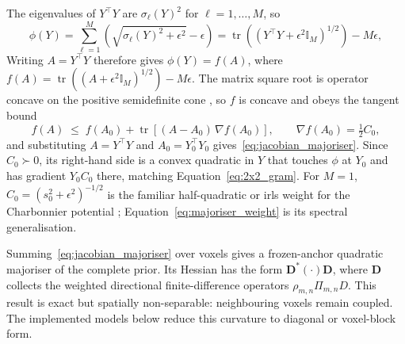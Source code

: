 The eigenvalues of $Y^\top Y$ are $\sigma_\ell(Y)^2$ for $\ell=1,\dots,M$, so
\begin{equation}
    \phi(Y)
    =\sum_{\ell=1}^{M}\left(\sqrt{\sigma_\ell(Y)^2+\epsilon^2}-\epsilon\right)
    =\operatorname{tr}\!\left(\left(Y^\top Y+\epsilon^2\mathbb{I}_M\right)^{1/2}\right)-M\epsilon ,
    \label{eq:phi_as_trace}
\end{equation}
Writing $A=Y^\top Y$ therefore gives $\phi(Y)=f(A)$, where $f(A)=\operatorname{tr}((A+\epsilon^2\mathbb{I}_M)^{1/2})-M\epsilon$. The matrix square root is operator concave on the positive semidefinite cone \cite{bhatiaMatrixAnalysis1997a}, so $f$ is concave and obeys the tangent bound
\begin{equation}
    f(A)\;\leq\;f(A_0)+\operatorname{tr}\!\left[(A-A_0)\,\nabla f(A_0)\right],
    \qquad
    \nabla f(A_0)=\tfrac12 C_0 ,
    \label{eq:concave_tangent}
\end{equation}
and substituting $A=Y^\top Y$ and $A_0=Y_0^\top Y_0$ gives~\eqref{eq:jacobian_majoriser}. Since $C_0\succ0$, its right-hand side is a convex quadratic in $Y$ that touches $\phi$ at $Y_0$ and has gradient $Y_0C_0$ there, matching Equation~\eqref{eq:2x2_gram}. For $M=1$, $C_0=(s_0^2+\epsilon^2)^{-1/2}$ is the familiar half-quadratic or \gls{irls} weight for the Charbonnier potential \cite{fessler_image_2017, charbonnier_deterministic_1997}; Equation~\eqref{eq:majoriser_weight} is its spectral generalisation.

Summing~\eqref{eq:jacobian_majoriser} over voxels gives a frozen-anchor quadratic majoriser of the complete prior. Its Hessian has the form $\bm{D}^\ast(\cdot)\bm{D}$, where $\bm{D}$ collects the weighted directional finite-difference operators $\rho_{m,n}\Pi_{m,n}D$. This result is exact but spatially non-separable: neighbouring voxels remain coupled. The implemented models below reduce this curvature to diagonal or voxel-block form.

